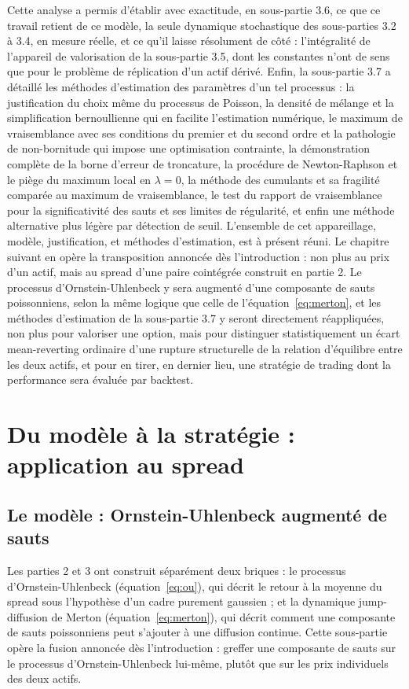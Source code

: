 \documentclass{article}
\begin{document}
Cette analyse a permis d'établir avec exactitude, en sous-partie 3.6, ce que ce travail retient de ce modèle, la seule dynamique stochastique des sous-parties 3.2 à 3.4, en mesure réelle, et ce qu'il laisse résolument de côté : l'intégralité de l'appareil de valorisation de la sous-partie 3.5, dont les constantes n'ont de sens que pour le problème de réplication d'un actif dérivé. Enfin, la sous-partie 3.7 a détaillé les méthodes d'estimation des paramètres d'un tel processus : la justification du choix même du processus de Poisson, la densité de mélange et la simplification bernoullienne qui en facilite l'estimation numérique, le maximum de vraisemblance avec ses conditions du premier et du second ordre et la pathologie de non-bornitude qui impose une optimisation contrainte, la démonstration complète de la borne d'erreur de troncature, la procédure de Newton-Raphson et le piège du maximum local en $\lambda=0$, la méthode des cumulants et sa fragilité comparée au maximum de vraisemblance, le test du rapport de vraisemblance pour la significativité des sauts et ses limites de régularité, et enfin une méthode alternative plus légère par détection de seuil.
L'ensemble de cet appareillage, modèle, justification, et méthodes d'estimation, est à présent réuni. Le chapitre suivant en opère la transposition annoncée dès l'introduction : non plus au prix d'un actif, mais au spread d'une paire cointégrée construit en partie 2. Le processus d'Ornstein-Uhlenbeck y sera augmenté d'une composante de sauts poissonniens, selon la même logique que celle de l'équation~\eqref{eq:merton}, et les méthodes d'estimation de la sous-partie 3.7 y seront directement réappliquées, non plus pour valoriser une option, mais pour distinguer statistiquement un écart mean-reverting ordinaire d'une rupture structurelle de la relation d'équilibre entre les deux actifs, et pour en tirer, en dernier lieu, une stratégie de trading dont la performance sera évaluée par backtest.
\section{Du modèle à la stratégie : application au spread}
\subsection{Le modèle : Ornstein-Uhlenbeck augmenté de sauts}
Les parties 2 et 3 ont construit séparément deux briques : le processus d'Ornstein-Uhlenbeck (équation~\eqref{eq:ou}), qui décrit le retour à la moyenne du spread sous l'hypothèse d'un cadre purement gaussien ; et la dynamique jump-diffusion de Merton (équation~\eqref{eq:merton}), qui décrit comment une composante de sauts poissonniens peut s'ajouter à une diffusion continue. Cette sous-partie opère la fusion annoncée dès l'introduction : greffer une composante de sauts sur le processus d'Ornstein-Uhlenbeck lui-même, plutôt que sur les prix individuels des deux actifs.
\end{document}
